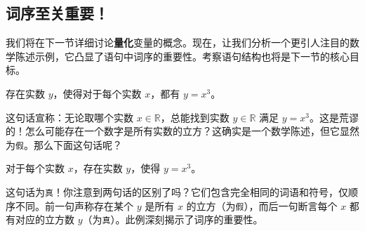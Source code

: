 \subsection{词序至关重要！}\label{sec:section4.2.4}

我们将在下一节详细讨论\textbf{量化}变量的概念。现在，让我们分析一个更引人注目的数学陈述示例，它凸显了语句中词序的重要性。考察语句结构也将是下一节的核心目标。
\begin{center}
    存在实数 $y$，使得对于每个实数 $x$，都有 $y = x^3$。
\end{center}
这句话宣称：无论取哪个实数 $x \in \mathbb{R}$，总能找到实数 $y \in \mathbb{R}$ 满足 $y = x^3$。这是荒谬的！怎么可能存在一个数字是所有实数的立方？这确实是一个数学陈述，但它显然为\verb|假|。那么下面这句话呢？
\begin{center}
    对于每个实数 $x$，存在实数 $y$，使得 $y = x^3$。
\end{center}
这句话为\verb|真|！你注意到两句话的区别了吗？它们包含完全相同的词语和符号，仅顺序不同。前一句声称存在某个 $y$ 是所有 $x$ 的立方（为\verb|假|），而后一句断言每个 $x$ 都有对应的立方数 $y$（为\verb|真|）。此例深刻揭示了词序的重要性。

\clearpage
